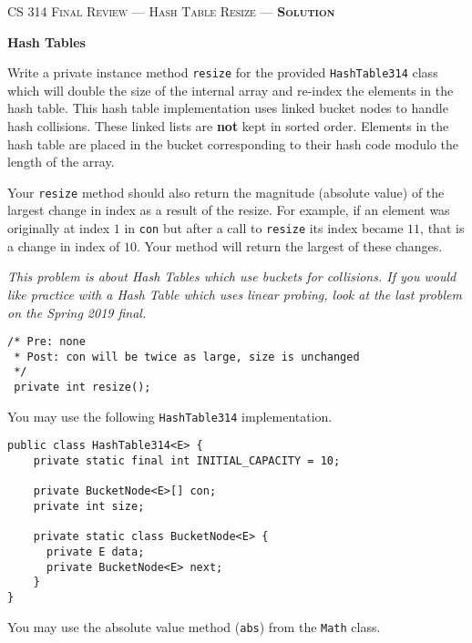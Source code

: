 \documentclass[12pt,letter]{article}
\begin{document}
\noindent\textsc{\large CS 314 Final Review --- Hash Table Resize --- \textbf{Solution}}

\vspace{6pt}
\noindent\textbf{Hash Tables}

\vspace{2pt}
\noindent Write a private instance method \texttt{resize} for the provided \texttt{HashTable314} class which will double the size of the internal
array and re-index the elements in the hash table. This hash table implementation uses linked bucket nodes to handle hash collisions. 
These linked lists are \textbf{not} kept in sorted order. Elements in the hash table are placed in the bucket corresponding to their 
hash code modulo the length of the array.

\vspace{4pt}
\noindent Your \texttt{resize} method should also return the magnitude (absolute value) of the largest change in index as a result of the resize.
For example, if an element was originally at index $1$ in \texttt{con} but after a call to \texttt{resize} its index became $11$, that is a 
change in index of $10$. Your method will return the largest of these changes.

\vspace{4pt}
\noindent \emph{This problem is about Hash Tables which use buckets for collisions. If you would like practice with a Hash Table which uses linear probing, 
look at the last problem on the Spring 2019 final.}

\vspace{4pt}

\begin{verbatim}
/* Pre: none
 * Post: con will be twice as large, size is unchanged
 */
 private int resize();
\end{verbatim}

\vspace{6pt}
\noindent You may use the following \texttt{HashTable314} implementation.
\begin{verbatim}
public class HashTable314<E> {
    private static final int INITIAL_CAPACITY = 10;

    private BucketNode<E>[] con;
    private int size;

    private static class BucketNode<E> {
      private E data;
      private BucketNode<E> next;
    }
}
\end{verbatim}


\noindent You may use the absolute value method (\texttt{abs}) from the \texttt{Math} class.
\end{document}
